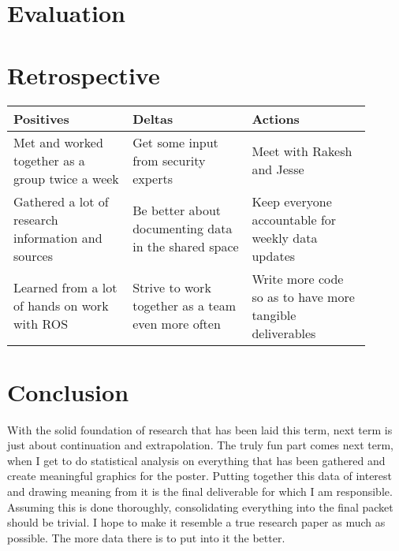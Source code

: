 \documentclass[IEEEtran,letterpaper,12pt,notitlepage,draftclsnofoot,onecolumn]{article}
\begin{document}
\section*{Evaluation}

\section*{Retrospective}
\begin{center}
\begin{tabular}{ |p{0.3\linewidth}|p{0.3\linewidth}|p{0.3\linewidth}| }
 \hline
 \centering Positives &
 \centering Deltas &
 \centering Actions \tabularnewline
 \hline
 Met and worked together as a group twice a week &
 Get some input from security experts &
 Meet with Rakesh and Jesse \tabularnewline
 \hline
 Gathered a lot of research information and sources &
 Be better about documenting data in the shared space &
 Keep everyone accountable for weekly data updates \tabularnewline
 \hline
 Learned from a lot of hands on work with ROS &
 Strive to work together as a team even more often &
 Write more code so as to have more tangible deliverables \tabularnewline
 \hline
\end{tabular}
\end{center}

\section*{Conclusion}
With the solid foundation of research that has been laid this term, next term is just about continuation and extrapolation.
The truly fun part comes next term, when I get to do statistical analysis on everything that has been gathered and create meaningful graphics for the poster.
Putting together this data of interest and drawing meaning from it is the final deliverable for which I am responsible.
Assuming this is done thoroughly, consolidating everything into the final packet should be trivial.
I hope to make it resemble a true research paper as much as possible.
The more data there is to put into it the better.
\end{document}
